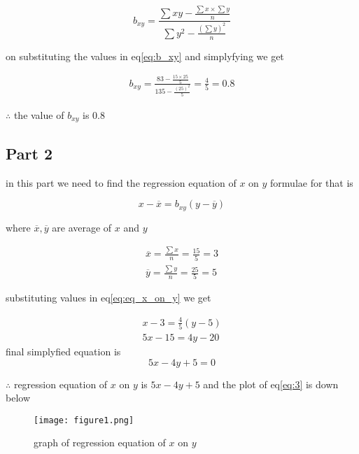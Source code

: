 \documentclass[journal,12pt,twocolumn]{IEEEtran}
\begin{document}
\begin{flushleft}
      \begin{equation}
          \label{eq:b_xy}
          b_{xy}=\frac{\sum xy-\frac{{\sum x}\times  {\sum y}}{n} }{\sum y^{2}-\frac{(\sum y)^{2}}{n} }
      \end{equation}
      
   on substituting the values in eq\eqref{eq:b_xy} and simplyfying  we get 
 
     \begin{align}
         b_{xy}=\frac{83-\frac{15\times25}{5}}{135-\frac{(25)^{2}}{5} } = \frac{4}{5} = 0.8
     \end{align}
     
$\therefore$ the value of $b_{xy}$ is 0.8
 
 
 
\subsection*{\textbf{Part 2}}
 in this part we need to find the regression equation of $x$ on $y$
 \newline
 formulae for that is 
 
       \begin{equation}
           \label{eq:eq_x_on_y}
            x-\overline{x} = b_{xy}(y-\overline{y})
       \end{equation}
       
  where $\overline{x},\overline{y}$ are average of $x$ and $y$
 
    \begin{align}
         \overline{x} = \frac{\sum x}{n} = \frac{15}{5} = 3 \\
         \overline{y} = \frac{\sum y}{n} = \frac{25}{5} = 5
    \end{align}
    
  substituting values in eq\eqref{eq:eq_x_on_y} we get 
 
    \begin{align}
         x-3 = \frac{4}{5}(y-5) \\
         5x - 15 = 4y - 20 
    \end{align}
   final simplyfied equation is 
    \begin{equation}
         \label{eq:3}
          5x - 4y + 5 = 0
    \end{equation}
    
    
    
$\therefore$ regression equation of $x$ on $y$ is $5x-4y+5$ and the plot of eq\eqref{eq:3} is down below



\begin{figure}[h!]
		\centering
     	\texttt{[image: figure1.png]}
    	\caption{graph of regression equation of $x$ on $y$}
	    \label{Fig1}
\end{figure}

\end{flushleft}
\end{document}
